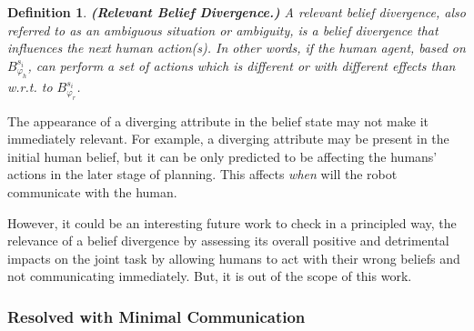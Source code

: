 \documentclass[letterpaper]{article} %
\newtheorem{definition}{Definition}
\begin{document}
\begin{definition} \label{def:reldiv}
\textbf{(Relevant Belief Divergence.)} A relevant belief divergence, also referred to as an ambiguous situation or ambiguity, is a belief divergence that influences the next human action(s). In other words, if the human agent, based on $\mathit{B}_{\varphi_h}^{s_i}$, can perform a set of actions which is different or with different effects than w.r.t. to $\mathit{B}_{\varphi_r}^{s_i}$.
\end{definition}

The appearance of a diverging attribute in the belief state may not make it immediately relevant. 
For example, a diverging attribute may be present in the initial human belief, but it can be only predicted to be affecting the humans' actions in the later stage of planning.
This affects \textit{when} will the robot communicate with the human.

However, it could be an interesting future work to check in a principled way, the relevance of a belief divergence 
by assessing its overall positive and detrimental impacts on the joint task by allowing humans to act with their wrong beliefs and not communicating immediately.
But, it is out of the scope of this work. 

\subsubsection{Resolved with Minimal Communication}


\end{document}
